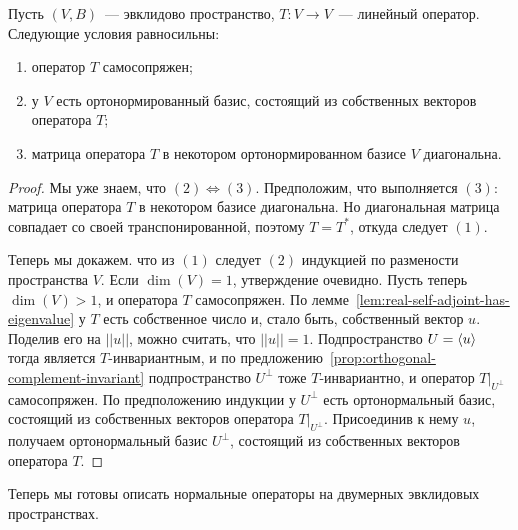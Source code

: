 \begin{theorem}\label{thm:spectral-real-self-adjoint}
Пусть $(V,B)$~--- эвклидово пространство,
$T\colon V\to V$~--- линейный оператор.
Следующие условия равносильны:
\begin{enumerate}
\item оператор $T$ самосопряжен;
\item у $V$ есть ортонормированный базис, состоящий из собственных
векторов оператора $T$;
\item матрица оператора $T$ в некотором ортонормированном базисе
$V$ диагональна.
\end{enumerate}
\end{theorem}
\begin{proof}
Мы уже знаем, что $(2)\Leftrightarrow (3)$. Предположим, что
выполняется $(3)$: матрица оператора $T$ в некотором базисе
диагональна. Но диагональная матрица совпадает со своей
транспонированной, поэтому $T=T^*$, откуда следует $(1)$.

Теперь мы докажем. что из $(1)$ следует $(2)$ индукцией по размености
пространства $V$.
Если $\dim(V)=1$, утверждение очевидно.
Пусть теперь $\dim(V) > 1$, и оператора $T$ самосопряжен.
По лемме~\ref{lem:real-self-adjoint-has-eigenvalue} у $T$ есть
собственное число и, стало быть, собственный вектор $u$.
Поделив его на $||u||$, можно считать, что $||u|| = 1$.
Подпространство $U = \langle u\rangle$ тогда является $T$-инвариантным, и по
предложению~\ref{prop:orthogonal-complement-invariant}
подпространство $U^\perp$ тоже $T$-инвариантно,
и оператор $T|_{U^\perp}$ самосопряжен.
По предположению индукции у $U^\perp$ есть ортонормальный базис,
состоящий из собственных векторов оператора $T|_{U^\perp}$.
Присоединив к нему $u$, получаем ортонормальный базис $U^\perp$,
состоящий из собственных векторов оператора $T$.
\end{proof}

Теперь мы готовы описать нормальные операторы на двумерных эвклидовых
пространствах.

